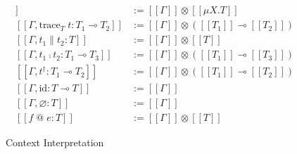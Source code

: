 \documentclass{jsarticle}
\newcommand{\semantics}[1]{[\![ #1 ]\!]}
\begin{document}
\begin{figure}[H]
\begin{minipage}[b]{0.48\columnwidth}
\begin{align*}
      \semantics{\Gamma,\text{fold}_{\mu{X}.T}\;u:\mu{X}.T} &:= \semantics{\Gamma}\otimes\semantics{\mu{X}.T} \\
      \semantics{\Gamma,\text{trace}_T\;t:T_1\multimap{}T_2} &:= \semantics{\Gamma}\otimes(\semantics{T_1}\multimap\semantics{T_2}) \\
      \semantics{\Gamma,t_1\parallel{}t_2:T} &:= \semantics{\Gamma}\otimes\semantics{T} \\
      \semantics{\Gamma,t_1\fcmp{}t_2:T_1\multimap{}T_3} &:= \semantics{\Gamma}\otimes(\semantics{T_1}\multimap\semantics{T_3}) \\
      \semantics{\Gamma,t^\dagger:T_1\multimap{}T_2} &:= \semantics{\Gamma}\otimes(\semantics{T_1}\multimap\semantics{T_2}) \\
      \semantics{\Gamma,\text{id}:T\multimap{}T} &:= \semantics{\Gamma} \\
      \semantics{\Gamma,\varnothing:T} &:= \semantics{\Gamma} \\
      \semantics{f\;\text{@}\;e:T} &:= \semantics{\Gamma}\otimes\semantics{T}
    \end{align*}
    \caption{Context Interpretation}
    \label{fig:cxt_interpret}
  \end{minipage}
\end{figure}
\end{document}
